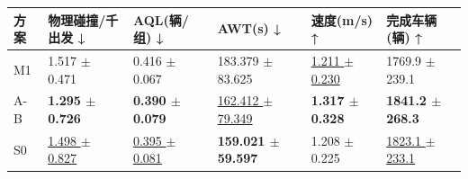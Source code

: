 \begin{tabular}{llllll}
\toprule
方案 & 物理碰撞/千出发 ↓ & AQL(辆/组) ↓ & AWT(s) ↓ & 速度(m/s) ↑ & 完成车辆(辆) ↑ \\
\midrule
M1 & 1.517 $\pm$ 0.471 & 0.416 $\pm$ 0.067 & 183.379 $\pm$ 83.625 & \underline{1.211 $\pm$ 0.230} & 1769.9 $\pm$ 239.1 \\
A-B & \textbf{1.295 $\pm$ 0.726} & \textbf{0.390 $\pm$ 0.079} & \underline{162.412 $\pm$ 79.349} & \textbf{1.317 $\pm$ 0.328} & \textbf{1841.2 $\pm$ 268.3} \\
S0 & \underline{1.498 $\pm$ 0.827} & \underline{0.395 $\pm$ 0.081} & \textbf{159.021 $\pm$ 59.597} & 1.208 $\pm$ 0.225 & \underline{1823.1 $\pm$ 233.1} \\
\bottomrule
\end{tabular}